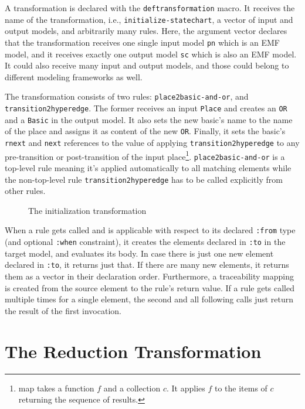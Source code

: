 \documentclass[submission]{eptcs}
\begin{document}
A transformation is declared with the \verb|deftransformation| macro.  It
receives the name of the transformation, i.e., \verb|initialize-statechart|, a
vector of input and output models, and arbitrarily many rules.  Here, the
argument vector declares that the transformation receives one single input
model \verb|pn| which is an EMF model, and it receives exactly one output model
\verb|sc| which is also an EMF model.  It could also receive many input and
output models, and those could belong to different modeling frameworks as well.

The transformation consists of two rules: \verb|place2basic-and-or|, and
\verb|transition2hyperedge|.  The former receives an input \verb|Place| and
creates an \verb|OR| and a \verb|Basic| in the output model.  It also sets the
new basic's name to the name of the place and assigns it as content of the new
\verb|OR|.  Finally, it sets the basic's \verb|rnext| and \verb|next|
references to the value of applying \verb|transition2hyperedge| to any
pre-transition or post-transition of the input place\footnote{\textsf{map}
  takes a function $f$ and a collection $c$.  It applies $f$ to the items of
  $c$ returning the sequence of results.}.  \verb|place2basic-and-or| is a
top-level rule meaning it's applied automatically to all matching elements
while the non-top-level rule \verb|transition2hyperedge| has to be called
explicitly from other rules.

\begin{figure}[h!]
  
  \label{lst:init}
  \caption{The initialization transformation}
\end{figure}

When a rule gets called and is applicable with respect to its declared
\verb|:from| type (and optional \verb|:when| constraint), it creates the
elements declared in \verb|:to| in the target model, and evaluates its body.
In case there is just one new element declared in \verb|:to|, it returns just
that.  If there are many new elements, it returns them as a vector in their
declaration order.  Furthermore, a traceability mapping is created from the
source element to the rule's return value.  If a rule gets called multiple
times for a single element, the second and all following calls just return the
result of the first invocation.


\section{The Reduction Transformation}
\label{sec:reduction-transformation}
\end{document}
